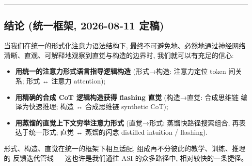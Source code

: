 \documentclass[
]{article}
\providecommand{\tightlist}{%
  \setlength{\itemsep}{0pt}\setlength{\parskip}{0pt}}
\begin{document}
\begin{center}\rule{0.5\linewidth}{0.5pt}\end{center}

\subsection{结论 (统一框架, 2026-08-11
定稿)}\label{ux7ed3ux8bba-ux7edfux4e00ux6846ux67b6-2026-08-11-ux5b9aux7a3f}

当我们在统一的形式化注意力语法结构下, 最终不可避免地、必然地通过神经网络
清晰、直观、可解释地观察到直觉与构造的边界时, 我们就可以有充足的信心:

\begin{itemize}
\tightlist
\item
  \textbf{用统一的注意力形式语言指导逻辑构造} (形式→构造: 注意力定位
  token 间关系; 形式 ↔ 注意力 attention);
\item
  \textbf{用精确的合成 CoT 逻辑构造获得 flashing 直觉} (构造→直觉:
  合成思维链 编译为快速推理; 构造 ↔ 合成思维链 synthetic CoT);
\item
  \textbf{用蒸馏的直觉上下文穷举注意力形式} (直觉→形式:
  蒸馏快路径搜索组合, 再表达于统一形式; 直觉 ↔ 蒸馏的闪念 distilled
  intuition / flashing).
\end{itemize}

形式、构造、直觉在统一的框架下相互适配,
组成再不分彼此的教学、训练、推理的 反馈迭代管线 --- 这也许是我们通往 ASI
的众多路径中, 相对较快的一条捷径。
\end{document}
